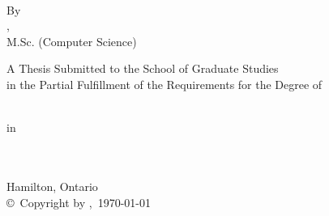 \documentclass[
11pt, %
oneside, %
english, %
onehalfspacing, %
]{McMasterThesis} %
\begin{document}
\begin{center}

\vfill
\textsc{\Large \ttitle} \\

\vspace{50pt}


\vfill
By\\
\uppercase\expandafter{\authorname},\\
M.Sc. (Computer Science)\\%

\vspace{50pt}

 \vfill
{\large A Thesis Submitted to the School of Graduate Studies\\ in the Partial Fulfillment of the Requirements for the Degree of}\\

\vspace{30pt}

\vfill
{\large  \degreename}\\ %
{\large  in}\\ %
{\large  \subjectareaname}\\
\vfill
\vfill

\vspace{50pt}

{\large \univname\, \\ Hamilton, Ontario}\\[4cm] %


{\copyright\, Copyright by \authorname,\, \today}\\[4cm] %

\end{center}

\newpage
{} %
\setcounter{page}{2} %
\end{document}
